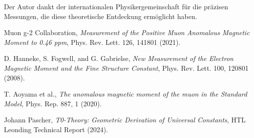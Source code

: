\documentclass[12pt,a4paper]{article}
\begin{document}
	Der Autor dankt der internationalen Physikergemeinschaft für die präzisen Messungen, die diese theoretische Entdeckung ermöglicht haben.
	
	\begin{thebibliography}{9}
		
		Muon g-2 Collaboration,
		\textit{Measurement of the Positive Muon Anomalous Magnetic Moment to 0.46 ppm},
		Phys. Rev. Lett. 126, 141801 (2021).
		
		D. Hanneke, S. Fogwell, and G. Gabrielse,
		\textit{New Measurement of the Electron Magnetic Moment and the Fine Structure Constant},
		Phys. Rev. Lett. 100, 120801 (2008).
		
		T. Aoyama et al.,
		\textit{The anomalous magnetic moment of the muon in the Standard Model},
		Phys. Rep. 887, 1 (2020).
		
		Johann Pascher,
		\textit{T0-Theory: Geometric Derivation of Universal Constants},
		HTL Leonding Technical Report (2024).
		
	\end{thebibliography}
	
\end{document}
